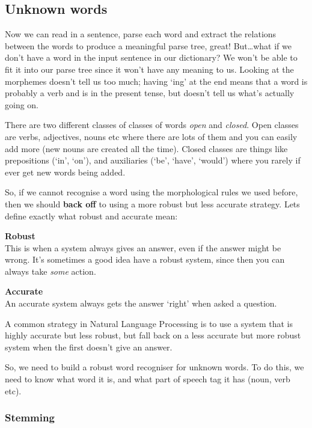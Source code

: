 \subsection{Unknown words}

Now we can read in a sentence, parse each word and extract the relations between
the words to produce a meaningful parse tree, great! But\dots what if we
don't have a word in the input sentence in our dictionary? We won't be able to
fit it into our parse tree since it won't have any meaning to us. Looking at the
morphemes doesn't tell us too much; having `ing' at the end means that a word is
probably a verb and is in the present tense, but doesn't tell us what's actually
going on.

There are two different classes of classes of words \textit{open} and
\textit{closed}. Open classes are verbs, adjectives, nouns etc where there are
lots of them and you can easily add more (new nouns are created all the time).
Closed classes are things like prepositions (`in', `on'), and auxiliaries (`be',
`have', `would') where you rarely if ever get new words being added.

So, if we cannot recognise a word using the morphological rules we used before,
then we should \textbf{back off} to using a more robust but less accurate
strategy. Lets define exactly what robust and accurate mean:

\begin{description}
  \item \textbf{Robust}\\
    This is when a system always gives an answer, even if the answer might be 
    wrong. It's sometimes a good idea have a robust system, since then you can 
    always take \textit{some} action.
  \item \textbf{Accurate}\\
    An accurate system always gets the answer `right' when asked a question.
\end{description}

A common strategy in Natural Language Processing is to use a system that is
highly accurate but less robust, but fall back on a less accurate but more
robust system when the first doesn't give an answer.

So, we need to build a robust word recogniser for unknown words. To do this, we
need to know what word it is, and what part of speech tag it has (noun, verb
etc).

\subsubsection{Stemming}

